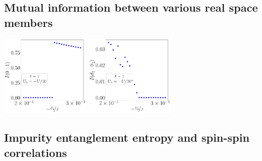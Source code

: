 \subsection*{Mutual information between various real space members}
\begin{center}
	\includegraphics[width=0.32\textwidth]{../figures/mi-01-D=1000.00000,t=1.00000,J=30.00000,V=1.50000J,Ub=-Uby10,N=4,U=59.85787,93.55363,25.pdf}
	\includegraphics[width=0.32\textwidth]{../figures/mi-d0-D=1000.00000,t=1.00000,J=30.00000,V=1.50000J,Ub=-Uby10,N=4,U=59.85787,93.55363,25.pdf}
\end{center}

\subsection*{Impurity entanglement entropy and spin-spin correlations}

